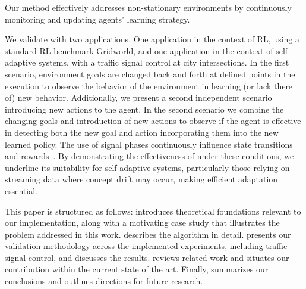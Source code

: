 Our method effectively addresses non-stationary environments by continuously monitoring and 
updating agents' learning strategy. 

We validate \adaptiverl with two applications. One application in the context of \ac{RL}, using a 
standard \ac{RL} benchmark Gridworld, and one application in the context of self-adaptive systems, 
with a traffic signal control at city intersections. In the first scenario, environment goals are changed 
back and forth at defined points in the execution to observe the behavior of the environment in learning 
(or lack there of) new behavior. Additionally, we present a second independent scenario introducing 
new actions to the agent. In the second scenario we combine the changing goals and introduction of 
new actions to observe if the agent is effective in detecting both the new goal and action incorporating 
them into the new learned policy. The use of signal phases continuously influence state transitions and 
rewards~\cite{meta-rl-traffic}. By demonstrating the effectiveness of \adaptiverl under these conditions, 
we underline its suitability for self-adaptive systems, particularly those relying on streaming data where 
concept drift may occur, making efficient adaptation essential.

This paper is structured as follows:  introduces theoretical foundations relevant to our implementation, along with a motivating case study that illustrates the problem addressed in this work.  describes the \adaptiverl algorithm in detail.  presents our validation methodology across the implemented experiments, including traffic signal control, and discusses the results.  reviews related work and situates our contribution within the current state of the art. Finally,  summarizes our conclusions and outlines directions for future research.

\endinput

